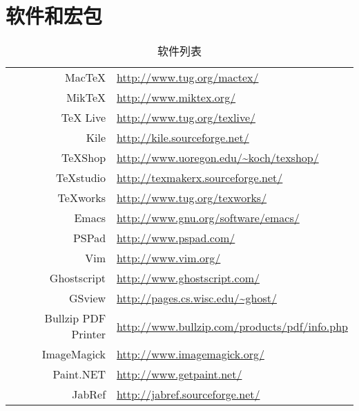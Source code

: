 \chapter{软件和宏包}

\begin{table}[!ht]
\caption{软件列表}
\label{tab:software_list}
\centering
\begin{tabular}{rl}
    \toprule
        MacTeX      & \url{http://www.tug.org/mactex/} \\
        MikTeX      & \url{http://www.miktex.org/} \\
        TeX Live    & \url{http://www.tug.org/texlive/} \\
    \midrule
        Kile        & \url{http://kile.sourceforge.net/} \\
        TeXShop     & \url{http://www.uoregon.edu/~koch/texshop/} \\
        TeXstudio   & \url{http://texmakerx.sourceforge.net/} \\
        TeXworks    & \url{http://www.tug.org/texworks/} \\
    \midrule
        Emacs       & \url{http://www.gnu.org/software/emacs/} \\
        PSPad       & \url{http://www.pspad.com/} \\
        Vim         & \url{http://www.vim.org/} \\
    \midrule
        Ghostscript & \url{http://www.ghostscript.com/} \\
        GSview      & \url{http://pages.cs.wisc.edu/~ghost/} \\
        Bullzip PDF Printer & \url{http://www.bullzip.com/products/pdf/info.php} \\
    \midrule
        ImageMagick & \url{http://www.imagemagick.org/} \\
        Paint.NET   & \url{http://www.getpaint.net/} \\
    \midrule
        JabRef      & \url{http://jabref.sourceforge.net/} \\
    \bottomrule
\end{tabular}
\end{table}

\pagebreak[4]

